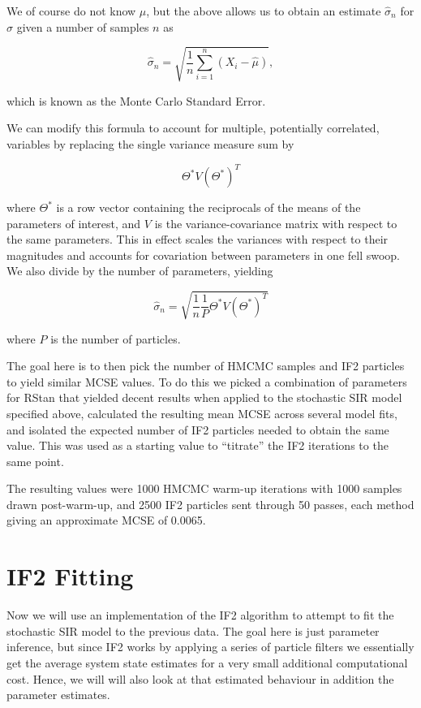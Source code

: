 	We of course do not know $\mu$, but the above allows us to obtain an estimate $\hat{\sigma}_n$ for $\sigma$ given a number of samples $n$ as

	\begin{equation}
		\hat{\sigma}_n = \sqrt{\frac{1}{n} \sum_{i=1}^{n} (X_i - \hat{\mu}) },
	\end{equation}

	which is known as the Monte Carlo Standard Error.

	We can modify this formula to account for multiple, potentially correlated, variables by replacing the single variance measure sum by

	\begin{equation}
		\Theta^* V (\Theta^*)^T
	\end{equation}

	where $\Theta^*$ is a row vector containing the reciprocals of the means of the parameters of interest, and $V$ is the variance-covariance matrix with respect to the same parameters. This in effect scales the variances with respect to their magnitudes and accounts for covariation between parameters in one fell swoop. We also divide by the number of parameters, yielding

	\begin{equation}
		\hat{\sigma}_n = \sqrt{\frac{1}{n} \frac{1}{P} \Theta^* V (\Theta^*)^T }
	\end{equation}

	where $P$ is the number of particles.

	The goal here is to then pick the number of HMCMC samples and IF2 particles to yield similar MCSE values. To do this we picked a combination of parameters for RStan that yielded decent results when applied to the stochastic SIR model specified above, calculated the resulting mean MCSE across several model fits, and isolated the expected number of IF2 particles needed to obtain the same value. This was used as a starting value to ``titrate'' the IF2 iterations to the same point.

	The resulting values were 1000 HMCMC warm-up iterations with 1000 samples drawn post-warm-up, and 2500 IF2 particles sent through 50 passes, each method giving an approximate MCSE of 0.0065.


\section{IF2 Fitting}

	Now we will use an implementation of the IF2 algorithm to attempt to fit the stochastic SIR model to the previous data. The goal here is just parameter inference, but since IF2 works by applying a series of particle filters we essentially get the average system state estimates for a very small additional computational cost. Hence, we will will also look at that estimated behaviour in addition the parameter estimates.


